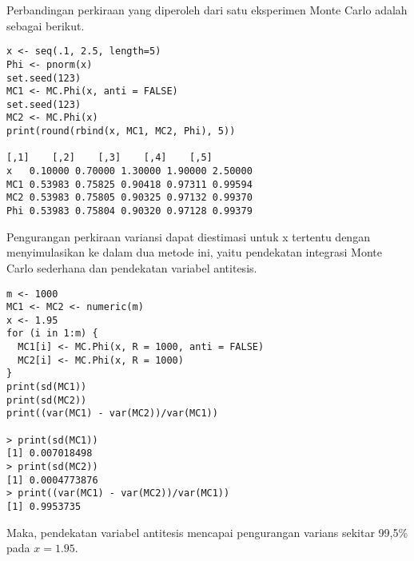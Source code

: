 \documentclass[a4paper,12pt]{article}
\theoremstyle{definition}
\begin{document}
Perbandingan perkiraan yang diperoleh dari satu eksperimen Monte Carlo adalah sebagai berikut.
\begin{lstlisting}
x <- seq(.1, 2.5, length=5)
Phi <- pnorm(x)
set.seed(123)
MC1 <- MC.Phi(x, anti = FALSE)
set.seed(123)
MC2 <- MC.Phi(x)
print(round(rbind(x, MC1, MC2, Phi), 5))

[,1]    [,2]    [,3]    [,4]    [,5]
x   0.10000 0.70000 1.30000 1.90000 2.50000
MC1 0.53983 0.75825 0.90418 0.97311 0.99594
MC2 0.53983 0.75805 0.90325 0.97132 0.99370
Phi 0.53983 0.75804 0.90320 0.97128 0.99379
\end{lstlisting}
Pengurangan perkiraan variansi dapat diestimasi untuk x tertentu dengan menyimulasikan ke dalam dua metode ini, yaitu pendekatan integrasi Monte Carlo sederhana dan pendekatan variabel antitesis.
\begin{lstlisting}
m <- 1000
MC1 <- MC2 <- numeric(m)
x <- 1.95
for (i in 1:m) {
  MC1[i] <- MC.Phi(x, R = 1000, anti = FALSE)
  MC2[i] <- MC.Phi(x, R = 1000)
}
print(sd(MC1))
print(sd(MC2))
print((var(MC1) - var(MC2))/var(MC1))

> print(sd(MC1))
[1] 0.007018498
> print(sd(MC2))
[1] 0.0004773876
> print((var(MC1) - var(MC2))/var(MC1))
[1] 0.9953735
\end{lstlisting}
Maka, pendekatan variabel antitesis mencapai pengurangan varians sekitar 99,5\% pada $x=1.95.$




\newpage
\printbibliography[heading=bibintoc,title={Daftar Pustaka}]
\end{document}
